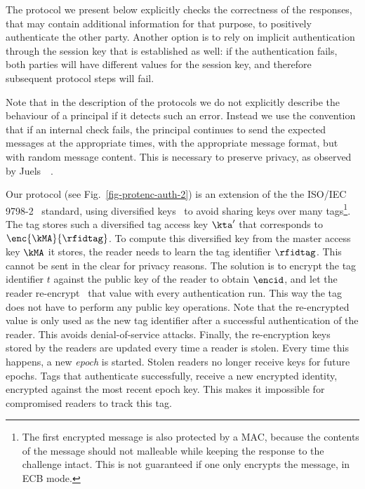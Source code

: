 The protocol we present below explicitly checks the correctness of the 
responses, that
may contain additional information for that purpose, to positively authenticate
the other party. Another option is to rely on implicit
authentication through the session key that is established as well: if the
authentication fails, both parties will have different values for the session
key, and therefore subsequent protocol steps will fail.

Note that in the description of the protocols we do not explicitly describe the
behaviour of a principal if it detects such an error. Instead we use the
convention that if an internal check fails, the principal continues to send the
expected messages at the appropriate times, with the appropriate message
format, but with random message content. This is necessary to preserve privacy,
as observed by 
Juels~\etal~\cite{juels2006strong-privacy-rfid,juels2007strong-privacy-rfid}.

Our protocol (see Fig.~\ref{fig-protenc-auth-2})
is an extension of the the ISO/IEC 9798-2~\cite{ISO9798-2}
standard, using diversified keys~\cite{AndB96} to avoid sharing keys over many
tags\footnote{The first encrypted message is also protected by a MAC, because
	the contents of the message should not malleable while keeping the
	response to the challenge intact. This is not guaranteed if one only
	encrypts the message, \eg in ECB mode.
}. 
The tag stores such a diversified
tag access key $\kta'$ that corresponds to
$\enc{\kMA}{\rfidtag}$. 
To compute this diversified key from the master access key
$\kMA$ it stores, the reader needs to
learn the tag identifier $\rfidtag$. 
This cannot be sent in the clear for privacy reasons. The solution is 
to encrypt the tag identifier $t$ against the public key of the reader
to obtain $\encid$, and let the reader re-encrypt~\cite{juels2003squealing}
that value with every authentication run. This way the tag does not have to perform any public key operations.
Note that the re-encrypted value is only used as the new tag identifier after a
successful authentication of the reader. This avoids denial-of-service attacks.
Finally, the re-encryption keys stored by the readers are updated every time
a reader is stolen. Every time this happens, a new \emph{epoch} is
started.
Stolen readers no longer receive keys for future epochs. Tags that 
authenticate successfully, receive a new encrypted identity, encrypted against
the most recent epoch key. This makes it impossible for compromised readers to
track this tag.

